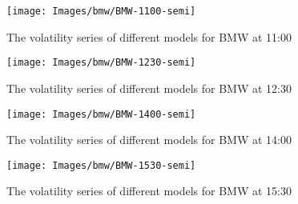 \begin{figure}[!htbp]
	\centering
	\texttt{[image: Images/bmw/BMW-1100-semi]}
	\caption[The volatility series of different models for BMW at 11:00]{The volatility series of different models for BMW at 11:00}
	\label{fig:BMWsemi1100}
\end{figure}

\begin{figure}[!htbp]
	\centering
	\texttt{[image: Images/bmw/BMW-1230-semi]}
	\caption[The volatility series of different models for BMW at 12:30]{The volatility series of different models for BMW at 12:30}
	\label{fig:BMWsemi1230}
\end{figure}

\begin{figure}[!htbp]
	\centering
	\texttt{[image: Images/bmw/BMW-1400-semi]}
	\caption[The volatility series of different models for BMW at 14:00]{The volatility series of different models for BMW at 14:00}
	\label{fig:BMWsemi1400}
\end{figure}

\begin{figure}[!htbp]
	\centering
	\texttt{[image: Images/bmw/BMW-1530-semi]}
	\caption[The volatility series of different models for BMW at 15:30]{The volatility series of different models for BMW at 15:30}
	\label{fig:BMWsemi1530}
\end{figure}





